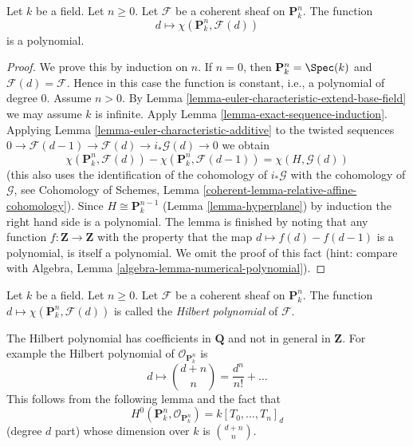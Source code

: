 \begin{lemma}
\label{lemma-hilbert-polynomial}
Let $k$ be a field. Let $n \geq 0$. Let $\mathcal{F}$ be a coherent sheaf
on $\mathbf{P}^n_k$. The function
$$
d \longmapsto \chi(\mathbf{P}^n_k, \mathcal{F}(d))
$$
is a polynomial.
\end{lemma}

\begin{proof}
We prove this by induction on $n$. If $n = 0$, then
$\mathbf{P}^n_k = \Spec(k)$ and $\mathcal{F}(d) = \mathcal{F}$.
Hence in this case the function is constant, i.e., a polynomial
of degree $0$. Assume $n > 0$. By
Lemma \ref{lemma-euler-characteristic-extend-base-field}
we may assume $k$ is infinite. Apply
Lemma \ref{lemma-exact-sequence-induction}.
Applying Lemma \ref{lemma-euler-characteristic-additive}
to the twisted sequences
$0 \to \mathcal{F}(d - 1) \to \mathcal{F}(d) \to i_*\mathcal{G}(d) \to 0$
we obtain
$$
\chi(\mathbf{P}^n_k, \mathcal{F}(d)) -
\chi(\mathbf{P}^n_k, \mathcal{F}(d - 1)) =
\chi(H, \mathcal{G}(d))
$$
(this also uses the identification of the cohomology of
$i_*\mathcal{G}$ with the cohomology of $\mathcal{G}$, see
Cohomology of Schemes, Lemma \ref{coherent-lemma-relative-affine-cohomology}).
Since $H \cong \mathbf{P}^{n - 1}_k$ (Lemma \ref{lemma-hyperplane})
by induction the right hand side is a polynomial.
The lemma is finished by noting that any function
$f : \mathbf{Z} \to \mathbf{Z}$ with the property that the map
$d \mapsto f(d) - f(d - 1)$ is a polynomial, is itself a polynomial.
We omit the proof of this fact (hint: compare with
Algebra, Lemma \ref{algebra-lemma-numerical-polynomial}).
\end{proof}

\begin{definition}
\label{definition-hilbert-polynomial}
Let $k$ be a field. Let $n \geq 0$. Let $\mathcal{F}$ be a coherent sheaf
on $\mathbf{P}^n_k$. The function
$d \mapsto \chi(\mathbf{P}^n_k, \mathcal{F}(d))$ is called the
{\it Hilbert polynomial} of $\mathcal{F}$.
\end{definition}

\noindent
The Hilbert polynomial has coefficients in $\mathbf{Q}$ and not
in general in $\mathbf{Z}$. For example the Hilbert polynomial
of $\mathcal{O}_{\mathbf{P}^n_k}$ is
$$
d \longmapsto {{d + n}\choose{n}} = \frac{d^n}{n!} + \ldots
$$
This follows from the following lemma and the fact that
$$
H^0(\mathbf{P}^n_k, \mathcal{O}_{\mathbf{P}^n_k}) = k[T_0, \ldots, T_n]_d
$$
(degree $d$ part) whose dimension over $k$ is ${{d + n}\choose{n}}$.

